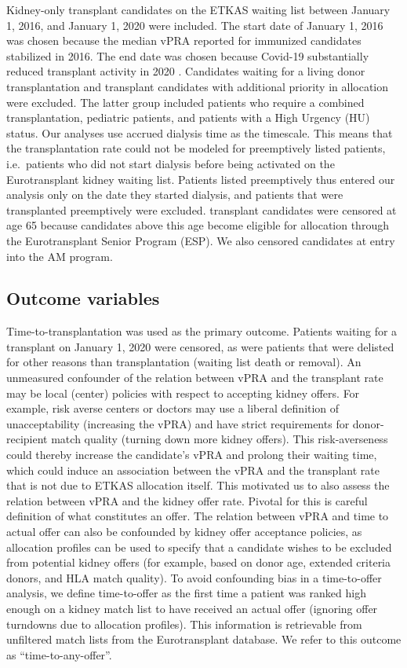 \documentclass[11pt,twoside,]{book}
\begin{document}
Kidney-only transplant candidates on the ETKAS waiting list between
January 1, 2016, and January 1, 2020 were included. The start date of
January 1, 2016 was chosen because the median vPRA reported for immunized
candidates stabilized in 2016. The end date was chosen because Covid-19
substantially reduced transplant activity in 2020 \citep{putzer2022}. Candidates waiting for a living donor transplantation and
transplant candidates with additional priority in allocation were excluded.
The latter group included patients who require a combined transplantation, pediatric
patients, and patients with a High Urgency (HU) status. Our analyses use
accrued dialysis time as the timescale. This means that the transplantation
rate could not be modeled for preemptively listed patients, i.e.~patients who did not start dialysis before being activated on the Eurotransplant kidney
waiting list. Patients listed
preemptively thus entered our analysis only on the date they started dialysis,
and patients that were transplanted preemptively were excluded. transplant candidates
were censored at age 65 because candidates above this age become eligible for allocation through
the Eurotransplant Senior Program (ESP). We also censored candidates at entry
into the AM program.

\subsection{Outcome variables}\label{outcome-variables}

Time-to-transplantation was used as the primary outcome. Patients
waiting for a transplant on January 1, 2020 were censored, as were patients
that were delisted for other reasons than transplantation (waiting list death or
removal). An unmeasured confounder of the relation between vPRA and the
transplant rate may be local (center) policies with respect to
accepting kidney offers. For example, risk averse centers or doctors may use a
liberal definition of unacceptability (increasing the vPRA) and have
strict requirements for donor-recipient match quality (turning down more
kidney offers). This risk-averseness could thereby increase the candidate's vPRA
and prolong their waiting time, which could induce an association between the
vPRA and the transplant rate that is not due to ETKAS allocation itself.
\newpage
This motivated us to also assess the relation between vPRA and the kidney
offer rate. Pivotal for this is careful definition of what constitutes
an offer. The relation between vPRA and time to actual offer can also be
confounded by kidney offer acceptance policies, as allocation
profiles can be used to specify that a candidate wishes to be excluded
from potential kidney offers (for example, based on donor age, extended
criteria donors, and HLA match quality). To avoid confounding bias in a
time-to-offer analysis, we define time-to-offer as the first time a
patient was ranked high enough on a kidney match list to have received
an actual offer (ignoring offer turndowns due to allocation profiles). This
information is retrievable from unfiltered match lists from the
Eurotransplant database. We refer to this outcome as ``time-to-any-offer''.
\end{document}

